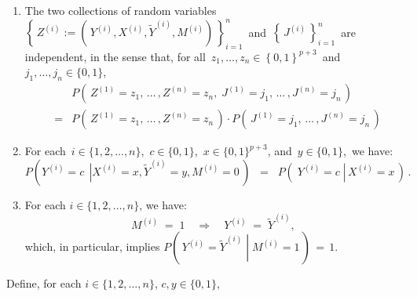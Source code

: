 \begin{theorem}
\begin{enumerate}
\item\label{ZJindependence}
	The two collections of random variables
	\,$\left\{\,Z^{(i)} := \left(\,Y^{(i)},X^{(i)},\widetilde{Y}^{(i)},M^{(i)}\right)\,\right\}_{i=1}^{n}$\,
	and
	\,$\left\{\,J^{(i)}\,\right\}_{i=1}^{n}$\,
	are independent, in the sense that, for all
	\,$z_{1}, \ldots, z_{n} \in \left\{0,1\right\}^{p+3}$\, and \,$j_{1}, \ldots, j_{n} \in \{0,1\}$,\,
	\begin{eqnarray*}
	&&
		P\!\left(\,Z^{(1)}=z_{1},\,\ldots\,,Z^{(n)}=z_{n},\;J^{(1)}=j_{1},\,\ldots\,,J^{(n)}=j_{n}\,\right)
	\\
	& = &
		P\!\left(\,Z^{(1)}=z_{1},\,\ldots\,,Z^{(n)}=z_{n}\,\right)
		\cdot
		P\!\left(\,J^{(1)}=j_{1},\,\ldots\,,J^{(n)}=j_{n}\,\right)
	\end{eqnarray*}
\item\label{MzeroImplies}
	For each \,$i\in\{1,2,\ldots,n\}$, \,$c\in\{0,1\}$, \,$x \in \{0,1\}^{p+3}$, and \,$y \in \{0,1\}$, \,we have:
	\begin{equation*}
	P\!\left(\left.Y^{(i)} = c\,\;\right\vert X^{(i)}=x,\widetilde{Y}^{(i)}=y,M^{(i)}=0\,\right)
	\;\; = \;\;
	P\!\left(\;Y^{(i)} = c\;\left\vert\,X^{(i)}=x\right.\,\right)\,.
	\end{equation*}
\item\label{MoneImpliesCEqualsY}
	For each $i\in\{1,2,\ldots,n\}$, we have:
	\begin{equation*}
	M^{(i)} \; = \; 1
	\quad\Longrightarrow\quad
	Y^{(i)} \; = \; \widetilde{Y}^{(i)},
	\end{equation*}
	which, in particular, implies $P\!\left(\,\left.Y^{(i)} = \widetilde{Y}^{(i)}\;\right\vert\;M^{(i)}=1\,\right)\,=\,1$.
\end{enumerate}
\renewcommand{\theenumi}{\roman{enumi}}
\renewcommand{\labelenumi}{\textnormal{(\theenumi)}$\;\;$}
Define, for each
\;$i \in \{1,2,\ldots,n\}$,
\;$c,y \in \{0,1\}$,

\end{theorem}
